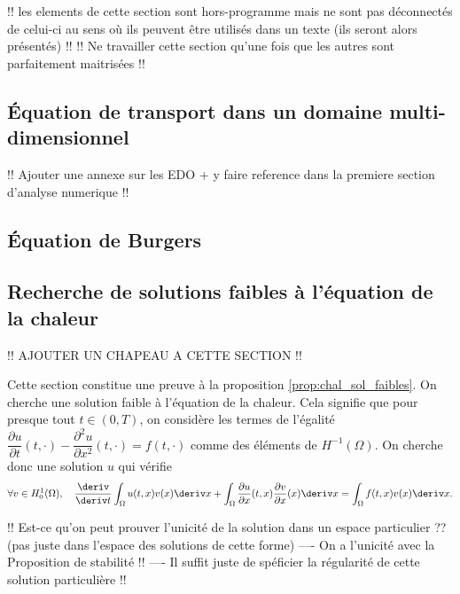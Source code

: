 \documentclass[12pt,a4paper,twoside]{article}
\begin{document}
!! les elements de cette section sont hors-programme mais ne sont pas 
d\'econnect\'es de celui-ci au sens o\`u ils peuvent \^etre utilis\'es 
dans un texte (ils seront alors pr\'esent\'es) !!
!! Ne travailler cette section qu'une fois que les autres sont parfaitement maitris\'ees !!

\subsection{\'Equation de transport dans un domaine multi-dimensionnel}
\label{subsec:transport_multiD}



!! Ajouter une annexe sur les EDO + y faire reference 
dans la premiere section d'analyse numerique !!


\subsection{\'Equation de Burgers}


\subsection{Recherche de solutions faibles \`a l'\'equation de la chaleur}
\label{subsec:chal_sol_faibles}

!! AJOUTER UN CHAPEAU A CETTE SECTION !!


Cette section constitue une preuve \`a la proposition
\ref{prop:chal_sol_faibles}.
On cherche une solution faible \`a l'\'equation de la chaleur.
Cela signifie que pour presque tout $t \in (0,T)$,
on consid\`ere les termes de l'\'egalit\'e
$\dfrac{\partial u}{\partial t}(t,\cdot) 
- \dfrac{\partial^2 u}{\partial x^2}(t,\cdot) = f(t,\cdot)$
comme des \'el\'ements de $H^{-1}(\Omega)$.
On cherche donc une solution $u$ qui v\'erifie
\begin{align}
  \label{eq:chal_vari}
  \forall v \in H^1_0(\Omega) ,  \quad
  \dfrac{\deriv}{\deriv t} \int_{\Omega} u(t,x) v(x) \deriv x
  + \int_{\Omega} \dfrac{\partial u}{\partial x}(t,x) \dfrac{\partial v}{\partial x}(x) \deriv x
  = \int_{\Omega} f(t,x) v(x) \deriv x .
\end{align}

!! Est-ce qu'on peut prouver l'unicit\'e de la solution dans un espace particulier ??
(pas juste dans l'espace des solutions de cette forme)
---- On a l'unicit\'e avec la Proposition de stabilit\'e !!
---- Il suffit juste de sp\'eficier la r\'egularit\'e de cette solution particuli\`ere !!
\end{document}

